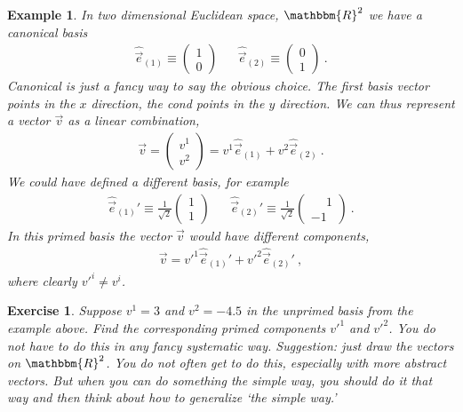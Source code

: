 \documentclass[
  11pt,
	colorful,
	raggedright,
]{tufte-style-thesis-flip}
\newtheorem{exercise}{Exercise}[section]
\newtheorem{example}{Example}[section]
\begin{document}
\begin{example}
In two dimensional Euclidean space, $\mathbbm{R}^2$ we have a canonical basis
\begin{align}
 \hat{\vec{e}}_{(1)} \equiv 
  \begin{pmatrix}
    1\\0
  \end{pmatrix}
  &&
 \hat{\vec{e}}_{(2)} \equiv 
  \begin{pmatrix}
    0\\1
  \end{pmatrix} \ .
\end{align}
\emph{Canonical} is just a fancy way to say \emph{the obvious choice}. The first basis vector points in the $x$ direction, the cond points in the $y$ direction. We can thus represent a vector $\vec{v}$ as a linear combination,
\begin{align}
  \vec{v} = 
  \begin{pmatrix}
    v^1 \\ v^2
  \end{pmatrix}
  =
  v^1\hat{\vec{e}}_{(1)} + v^2\hat{\vec{e}}_{(2)} \ .
\end{align}
We could have defined a different basis, for example
\begin{align}
 \hat{\vec{e}}_{(1)}' \equiv 
  \frac{1}{\sqrt{2}}
  \begin{pmatrix}
    1\\1
  \end{pmatrix}
  &&
 \hat{\vec{e}}_{(2)}' \equiv 
  \frac{1}{\sqrt{2}}
  \begin{pmatrix}
    \phantom{+}1\\-1
  \end{pmatrix} \ .
\end{align}
In this primed basis the vector $\vec{v}$ would have different components,
\begin{align}
  \vec{v} = v'^1\hat{\vec{e}}_{(1)}' + v'^2\hat{\vec{e}}_{(2)}' \ ,
\end{align}
where clearly $v'^i \neq v^i$.
\end{example}
\begin{exercise}
Suppose $v^1 = 3$ and $v^2 = -4.5$ in the unprimed basis from the example above. Find the corresponding primed components $v'^1$ and $v'^2$. You do not have to do this in any fancy systematic way. \emph{Suggestion}: just draw the vectors on $\mathbbm{R}^2$. You do not often get to do this, especially with more abstract vectors. But when you can do something the simple way, you should do it that way and then think about how to generalize `the simple way.'
\end{exercise}
\end{document}
